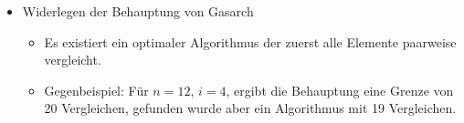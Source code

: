 \begin{frame}
  \begin{itemize}
    \item Widerlegen der Behauptung von Gasarch
          \begin{itemize}
            \item Es existiert ein optimaler Algorithmus der zuerst alle Elemente paarweise vergleicht.
            \item Gegenbeispiel: Für $n = 12$, $i = 4$, ergibt die Behauptung eine Grenze von 20
                  Vergleichen, gefunden wurde aber ein Algorithmus mit 19 Vergleichen.
          \end{itemize}
  \end{itemize}
\end{frame}

\thanksframe

